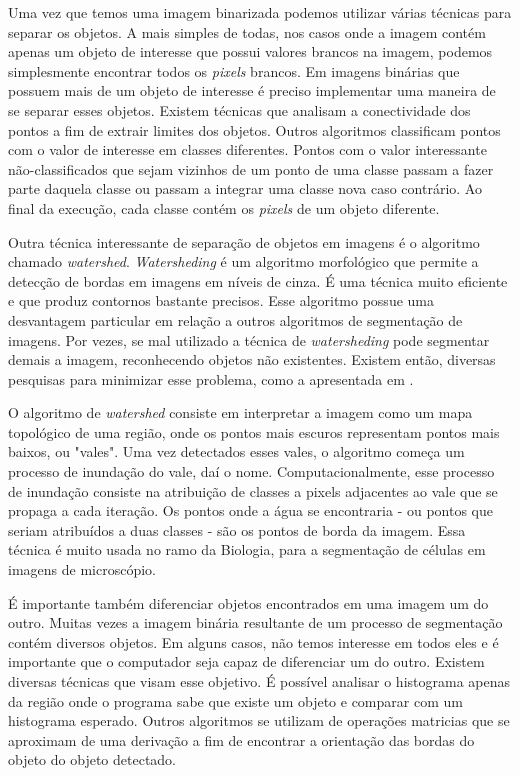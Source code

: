     Uma vez que temos uma imagem binarizada podemos utilizar várias técnicas para separar os objetos. A mais simples de todas, nos casos onde a imagem contém apenas um objeto de interesse que possui valores brancos na imagem, podemos simplesmente encontrar todos os \textit{pixels} brancos. Em imagens binárias que possuem mais de um objeto de interesse é preciso implementar uma maneira de se separar esses objetos. Existem técnicas que analisam a conectividade dos pontos a fim de extrair limites dos objetos.\cite{vkl1989jain} Outros algoritmos classificam pontos com o valor de interesse em classes diferentes. Pontos com o valor interessante não-classificados que sejam vizinhos de um ponto de uma classe passam a fazer parte daquela classe ou passam a integrar uma classe nova caso contrário. Ao final da execução, cada classe contém os \textit{pixels} de um objeto diferente.

    Outra técnica interessante de separação de objetos em imagens é o algoritmo chamado \textit{watershed}. \textit{Watersheding} é um algoritmo morfológico que permite a detecção de bordas em imagens em níveis de cinza. É uma técnica muito eficiente e que produz contornos bastante precisos. Esse algoritmo possue uma desvantagem particular em relação a outros algoritmos de segmentação de imagens. Por vezes, se mal utilizado a técnica de \textit{watersheding} pode segmentar demais a imagem, reconhecendo objetos não existentes. Existem então, diversas pesquisas para minimizar esse problema, como a apresentada em \cite{malpica1997applying}.

    O algoritmo de \textit{watershed} consiste em interpretar a imagem como um mapa topológico de uma região, onde os pontos mais escuros representam pontos mais baixos, ou "vales". Uma vez detectados esses vales, o algoritmo começa um processo de inundação do vale, daí o nome. Computacionalmente, esse processo de inundação consiste na atribuição de classes a pixels adjacentes ao vale que se propaga a cada iteração. Os pontos onde a água se encontraria - ou pontos que seriam atribuídos a duas classes - são os pontos de borda da imagem. Essa técnica é muito usada no ramo da Biologia, para a segmentação de células em imagens de microscópio.

    É importante também diferenciar objetos encontrados em uma imagem um do outro. Muitas vezes a imagem binária resultante de um processo de segmentação contém diversos objetos. Em alguns casos, não temos interesse em todos eles e é importante que o computador seja capaz de diferenciar um do outro. Existem diversas técnicas que visam esse objetivo. É possível analisar o histograma apenas da região onde o programa sabe que existe um objeto e comparar com um histograma esperado. Outros algoritmos se utilizam de operações matricias que se aproximam de uma derivação a fim de encontrar a orientação das bordas do objeto do objeto detectado.

